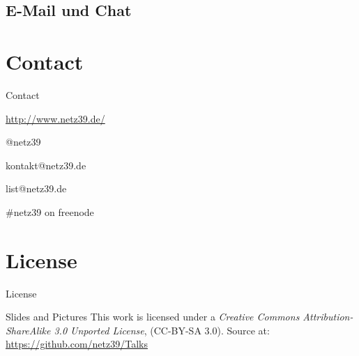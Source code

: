 \documentclass{beamer}
\begin{document}
\subsection{E-Mail und Chat}

\section{Contact}

\begin{frame}{Contact}
    \begin{center}
        \begin{description}
            \item[WWW] \url{http://www.netz39.de/}
            \item[Twitter/identi.ca] @netz39
            \item[E-Mail] kontakt@netz39.de
            \item[Mailingliste] list@netz39.de
            \item[IRC] \#netz39 on freenode
        \end{description}
    \end{center}
\end{frame}

\appendix

\section{License}

\begin{frame}{License}
    \begin{block}{Slides and Pictures}
        This work is licensed under a \emph{Creative Commons
        Attribution-ShareAlike 3.0 Unported License}, (CC-BY-SA 3.0).
        Source at: \url{https://github.com/netz39/Talks}
    \end{block}
\end{frame}
\end{document}
